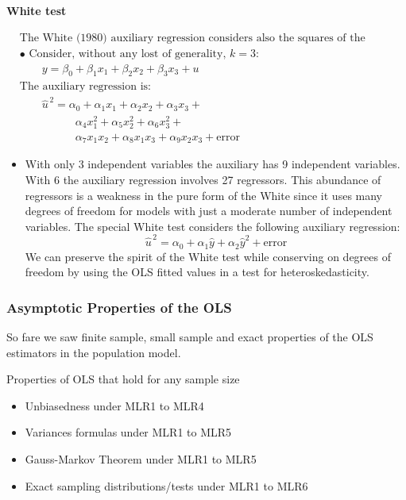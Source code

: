 \textbf{White test}

\[
\begin{aligned}
&\text{The White (1980) auxiliary regression considers also the squares of the independent variables and all cross products.}\\[6pt]
&\text{• Consider, without any lost of generality, } k = 3:\\
&\qquad y = \beta_0 + \beta_1 x_1 + \beta_2 x_2 + \beta_3 x_3 + u\\[6pt]
&\text{The auxiliary regression is:}\\
&\qquad \hat{u}^{\,2} =
 \alpha_0 + \alpha_1 x_1 + \alpha_2 x_2 + \alpha_3 x_3 +\\
&\qquad\qquad\quad
 \alpha_4 x_1^{2} + \alpha_5 x_2^{2} + \alpha_6 x_3^{2} +\\
&\qquad\qquad\quad
 \alpha_7 x_1 x_2 + \alpha_8 x_1 x_3 + \alpha_9 x_2 x_3 + \text{error}
\end{aligned}
\]


\begin{itemize}
    \item With only 3 independent variables the auxiliary has 9 independent variables. With 6 the auxiliary regression involves 27 regressors. This abundance of regressors is a weakness in the pure form of the White since it uses many degrees of freedom for models with just a moderate number of independent variables. The special White test considers the following auxiliary regression:
    \[
        \hat{u}^{\,2} = \alpha_0 + \alpha_1 \hat{y} + \alpha_2 \hat{y}^2 + \text{error}
    \]
    We can preserve the spirit of the White test while conserving on degrees of freedom by using the OLS fitted values in a test for heteroskedasticity.
\end{itemize}

\subsubsection{Asymptotic Properties of the OLS}


So fare we saw finite sample, small sample and exact properties of the OLS estimators in the population model.

\vspace{10pt}
Properties of OLS that hold for any sample size

\begin{itemize}
    \item Unbiasedness under MLR1 to MLR4
    \item Variances formulas under MLR1 to MLR5
    \item Gauss-Markov Theorem under MLR1 to MLR5
    \item Exact sampling distributions/tests under MLR1 to MLR6
\end{itemize}

